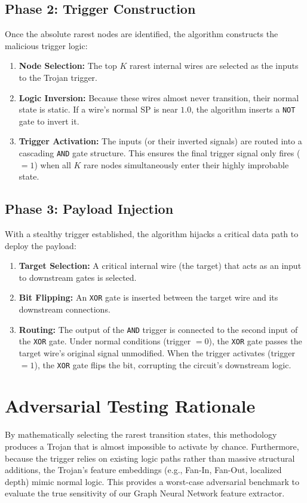 \documentclass[12pt]{article}
\begin{document}
\subsection{Phase 2: Trigger Construction}
Once the absolute rarest nodes are identified, the algorithm constructs the malicious trigger logic:
\begin{enumerate}
    \item \textbf{Node Selection:} The top $K$ rarest internal wires are selected as the inputs to the Trojan trigger.
    \item \textbf{Logic Inversion:} Because these wires almost never transition, their normal state is static. If a wire's normal SP is near $1.0$, the algorithm inserts a \texttt{NOT} gate to invert it.
    \item \textbf{Trigger Activation:} The inputs (or their inverted signals) are routed into a cascading \texttt{AND} gate structure. This ensures the final trigger signal only fires ($=1$) when all $K$ rare nodes simultaneously enter their highly improbable state. 
\end{enumerate}

\subsection{Phase 3: Payload Injection}
With a stealthy trigger established, the algorithm hijacks a critical data path to deploy the payload:
\begin{enumerate}
    \item \textbf{Target Selection:} A critical internal wire (the target) that acts as an input to downstream gates is selected.
    \item \textbf{Bit Flipping:} An \texttt{XOR} gate is inserted between the target wire and its downstream connections. 
    \item \textbf{Routing:} The output of the \texttt{AND} trigger is connected to the second input of the \texttt{XOR} gate. Under normal conditions (trigger $=0$), the \texttt{XOR} gate passes the target wire's original signal unmodified. When the trigger activates (trigger $=1$), the \texttt{XOR} gate flips the bit, corrupting the circuit's downstream logic.
\end{enumerate}

\section{Adversarial Testing Rationale}
By mathematically selecting the rarest transition states, this methodology produces a Trojan that is almost impossible to activate by chance. Furthermore, because the trigger relies on existing logic paths rather than massive structural additions, the Trojan's feature embeddings (e.g., Fan-In, Fan-Out, localized depth) mimic normal logic. This provides a worst-case adversarial benchmark to evaluate the true sensitivity of our Graph Neural Network feature extractor.
\end{document}
